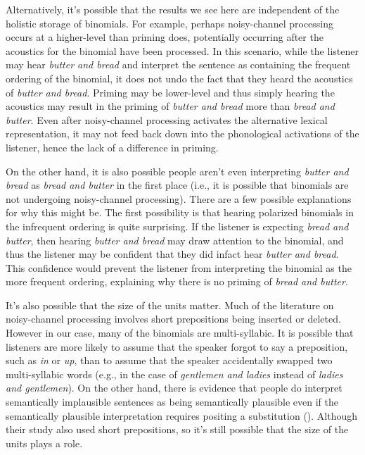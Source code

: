 \documentclass[
  12pt,
]{scrartcl}
\begin{document}
Alternatively, it's possible that the results we see here are
independent of the holistic storage of binomials. For example, perhaps
noisy-channel processing occurs at a higher-level than priming does,
potentially occurring after the acoustics for the binomial have been
processed. In this scenario, while the listener may hear \emph{butter
and bread} and interpret the sentence as containing the frequent
ordering of the binomial, it does not undo the fact that they heard the
acoustics of \emph{butter and bread}. Priming may be lower-level and
thus simply hearing the acoustics may result in the priming of
\emph{butter and bread} more than \emph{bread and butter}. Even after
noisy-channel processing activates the alternative lexical
representation, it may not feed back down into the phonological
activations of the listener, hence the lack of a difference in priming.

On the other hand, it is also possible people aren't even interpreting
\emph{butter and bread} as \emph{bread and butter} in the first place
(i.e., it is possible that binomials are not undergoing noisy-channel
processing). There are a few possible explanations for why this might
be. The first possibility is that hearing polarized binomials in the
infrequent ordering is quite surprising. If the listener is expecting
\emph{bread and butter}, then hearing \emph{butter and bread} may draw
attention to the binomial, and thus the listener may be confident that
they did infact hear \emph{butter and bread}. This confidence would
prevent the listener from interpreting the binomial as the more frequent
ordering, explaining why there is no priming of \emph{bread and butter}.

It's also possible that the size of the units matter. Much of the
literature on noisy-channel processing involves short prepositions being
inserted or deleted. However in our case, many of the binomials are
multi-syllabic. It is possible that listeners are more likely to assume
that the speaker forgot to say a preposition, such as \emph{in} or
\emph{up}, than to assume that the speaker accidentally swapped two
multi-syllabic words (e.g., in the case of \emph{gentlemen and ladies}
instead of \emph{ladies and gentlemen}). On the other hand, there is
evidence that people do interpret semantically implausible sentences as
being semantically plausible even if the semantically plausible
interpretation requires positing a substitution
(). Although their study also used short prepositions, so it's
still possible that the size of the units plays a role.
\end{document}
